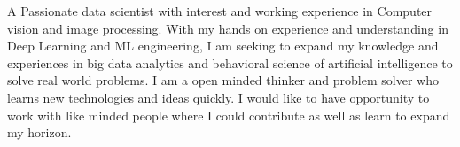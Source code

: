 A Passionate data scientist with interest and working experience in Computer vision and image processing. With my hands on experience and understanding in Deep Learning and ML engineering, I am seeking to expand my knowledge and experiences in big data analytics and behavioral science of artificial intelligence to solve real world problems. I am a open minded thinker and problem solver who learns new technologies and ideas quickly. I would like to have opportunity to work with like minded people where I could contribute as well as learn to expand my horizon.







